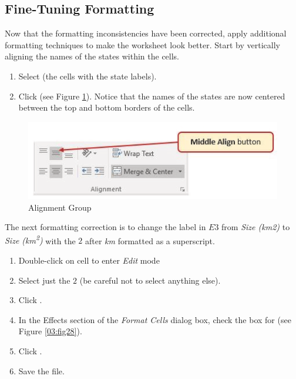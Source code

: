 \subsection{Fine-Tuning Formatting}

Now that the formatting inconsistencies have been corrected, apply additional formatting techniques to make the worksheet look better. Start by vertically aligning the names of the states within the cells.

\begin{enumbox}
	\begin{enumerate}
		\item Select  (the cells with the state labels).
		\item Click  (see Figure \ref{03:fig27}). Notice that the names of the states are now centered between the top and bottom borders of the cells.
	\end{enumerate}
\end{enumbox}
	
\begin{figure}[H]
	\centering
	\includegraphics[width=\maxwidth{.95\linewidth}]{gfx/ch03_fig27}
	\caption{Alignment Group}
	\label{03:fig27}
\end{figure}

The next formatting correction is to change the label in $ E3 $ from \textit{Size (km2)} to \textit{Size (km\textsuperscript{2})} with the $ 2 $ after \textit{km} formatted as a superscript.

\begin{enumbox}
	\begin{enumerate}
		\item Double-click on cell  to enter \textit{Edit} mode
		\item Select just the $ 2 $ (be careful not to select anything else).
		\item Click . 	
		\item In the Effects section of the \textit{Format Cells} dialog box, check the box for  (see Figure \ref{03:fig28}). 
		\item Click .
		\item Save the  file.
	\end{enumerate}
\end{enumbox}

